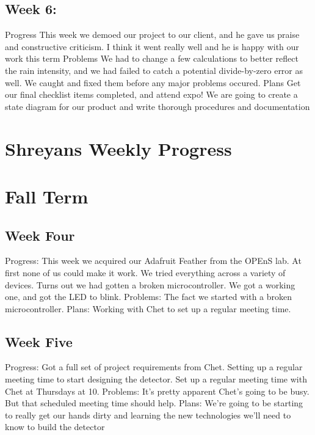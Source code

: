 \documentclass[letterpaper,10pt,draftclsnofoot,onecolumn]{article}
\begin{document}
\subsection{Week 6:}
Progress
This week we demoed our project to our client, and he gave us praise and constructive criticism. I think it went really well and he is happy with our work this term
\newline
Problems
We had to change a few calculations to better reflect the rain intensity, and we had failed to catch a potential divide-by-zero error as well. We caught and fixed them before any major problems occured.
\newline
Plans
Get our final checklist items completed, and attend expo! We are going to create a state diagram for our product and write thorough procedures and documentation


\pagebreak

\section{Shreyans Weekly Progress}

\section{Fall Term}
\subsection{Week Four}

Progress: This week we acquired our Adafruit Feather from the OPEnS lab. At first none of us could make it work. We tried everything across a variety of devices. Turns out we had gotten a broken microcontroller. We got a working one, and got the LED to blink.
\newline
Problems: The fact we started with a broken microcontroller.
\newline
Plans: Working with Chet to set up a regular meeting time.


\subsection{Week Five}

Progress: Got a full set of project requirements from Chet. Setting up a regular meeting time to start designing the detector. Set up a regular meeting time with Chet at Thursdays at 10.
\newline
Problems: It's pretty apparent Chet's going to be busy. But that scheduled meeting time should help.
\newline
Plans: We're going to be starting to really get our hands dirty and learning the new technologies we'll need to know to build the detector
\end{document}
